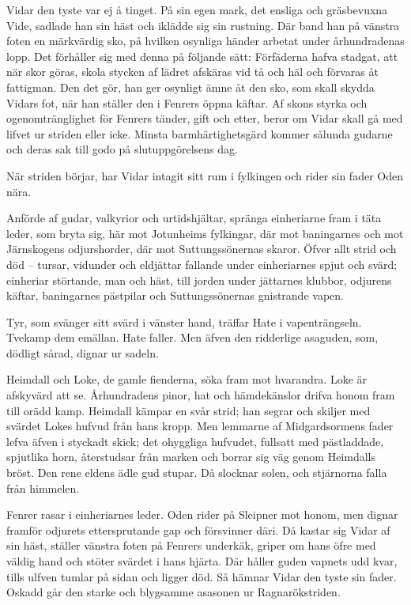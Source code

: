 Vidar den tyste var ej å tinget. På sin egen mark, det ensliga och
gräsbevuxna Vide, sadlade han sin häst och iklädde sig sin rustning. Där
band han på vänstra foten en märkvärdig sko, på hvilken osynliga händer
arbetat under århundradenas lopp. Det förhåller sig med denna på
följande sätt: Förfäderna hafva stadgat, att när skor göras,
\protect\hypertarget{lb1625905.xhtmlux5cux23start195}{}{}\protect\hypertarget{lb1625905.xhtmlux5cux23start195-a}{}{}\protect\hypertarget{lb1625905.xhtmlux5cux23start195-b}{}{}\protect\hypertarget{lb1625905.xhtmlux5cux23start195-c}{}{}\protect\hypertarget{lb1625905.xhtmlux5cux23start195-d}{}{}
skola stycken af lädret afskäras vid tå och häl och förvaras åt
fattigman. Den det gör, han ger osynligt ämne åt den sko, som skall
skydda Vidars fot, när han ställer den i Fenrers öppna käftar. Af skons
styrka och ogenomtränglighet för Fenrers tänder, gift och etter, beror
om Vidar skall gå med lifvet ur striden eller icke. Minsta
barmhärtighetsgärd kommer sålunda gudarne och deras sak till godo på
slutuppgörelsens dag.

När striden börjar, har Vidar intagit sitt rum i fylkingen och rider sin
fader Oden nära.

Anförde af gudar, valkyrior och urtidshjältar, spränga einheriarne fram
i täta leder, som bryta sig, här mot Jotunheims fylkingar, där mot
baningarnes och mot Järnskogens odjurshorder, där mot Suttungssönernas
skaror. Öfver allt strid och död -- tursar, vidunder och eldjättar
fallande under einheriarnes spjut och svärd; einheriar störtande, man
och häst, till jorden under jättarnes klubbor, odjurens käftar,
baningarnes pästpilar och Suttungssönernas gnistrande vapen.

Tyr, som svänger sitt svärd i vänster hand, träffar Hate i
vapenträngseln. Tvekamp dem emällan. Hate faller. Men äfven den
ridderlige asaguden, som, dödligt sårad, dignar ur sadeln.

Heimdall och Loke, de gamle fienderna, söka fram mot hvarandra. Loke är
afskyvärd att se. Århundradens pinor, hat och hämdekänslor drifva honom
fram till orädd kamp. Heimdall kämpar en svår strid; han segrar och
skiljer med svärdet Lokes hufvud från hans kropp. Men lemmarne af
Midgardsormens fader lefva äfven i styckadt skick; det ohyggliga
hufvudet, fullsatt med pästladdade, spjutlika horn, återstudsar från
marken och borrar sig väg genom Heimdalls bröst. Den rene eldens ädle
gud stupar. Då slocknar solen, och stjärnorna falla från himmelen.

Fenrer rasar i einheriarnes leder. Oden rider på Sleipner mot honom, men
dignar framför odjurets ettersprutande gap och försvinner däri. Då
kastar sig Vidar af sin häst, ställer vänstra foten på Fenrers underkäk,
griper om hans
\protect\hypertarget{lb1625905.xhtmlux5cux23start196}{}{}\protect\hypertarget{lb1625905.xhtmlux5cux23start196-a}{}{}\protect\hypertarget{lb1625905.xhtmlux5cux23start196-b}{}{}\protect\hypertarget{lb1625905.xhtmlux5cux23start196-c}{}{}\protect\hypertarget{lb1625905.xhtmlux5cux23start196-d}{}{}
öfre med väldig hand och stöter svärdet i hans hjärta. Där håller guden
vapnets udd kvar, tills ulfven tumlar på sidan och ligger död. Så hämnar
Vidar den tyste sin fader. Oskadd går den starke och blygsamme asasonen
ur Ragnarökstriden.

